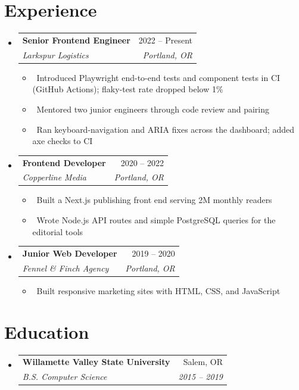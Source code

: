 \documentclass[letterpaper,10pt]{article}
\makeatletter
\newcommand{\resumeItem}[1]{\item\small{#1}}
\newcommand{\resumeSubheading}[4]{
\vspace{-1pt}\item
  \begin{tabular*}{0.97\textwidth}[t]{l@{\extracolsep{\fill}}r}
    \textbf{#1} & #2 \\
    \textit{#3} & \textit{#4} \\
  \end{tabular*}\vspace{-7pt}
}
\newcommand{\resumeSubHeadingList}{\begin{itemize}[leftmargin=0.15in, label={}]}
\newcommand{\resumeSubHeadingListEnd}{\end{itemize}}
\makeatother
\begin{document}
\section{Experience}
\resumeSubHeadingList
  \resumeSubheading
      {Senior Frontend Engineer}{2022 -- Present}
      {Larkspur Logistics}{Portland, OR}
      \resumeSubHeadingList
          \resumeItem{\textbullet\ Introduced Playwright end-to-end tests and component tests in CI (GitHub Actions); flaky-test rate dropped below 1\%}
          \resumeItem{\textbullet\ Mentored two junior engineers through code review and pairing}
          \resumeItem{\textbullet\ Ran keyboard-navigation and ARIA fixes across the dashboard; added axe checks to CI}
      \resumeSubHeadingListEnd
  \resumeSubheading
      {Frontend Developer}{2020 -- 2022}
      {Copperline Media}{Portland, OR}
      \resumeSubHeadingList
          \resumeItem{\textbullet\ Built a Next.js publishing front end serving 2M monthly readers}
          \resumeItem{\textbullet\ Wrote Node.js API routes and simple PostgreSQL queries for the editorial tools}
      \resumeSubHeadingListEnd
  \resumeSubheading
      {Junior Web Developer}{2019 -- 2020}
      {Fennel \& Finch Agency}{Portland, OR}
      \resumeSubHeadingList
          \resumeItem{\textbullet\ Built responsive marketing sites with HTML, CSS, and JavaScript}
      \resumeSubHeadingListEnd
\resumeSubHeadingListEnd

\section{Education}
\resumeSubHeadingList
  \resumeSubheading
      {Willamette Valley State University}{Salem, OR}
      {B.S. Computer Science}{2015 -- 2019}
\resumeSubHeadingListEnd
\end{document}
